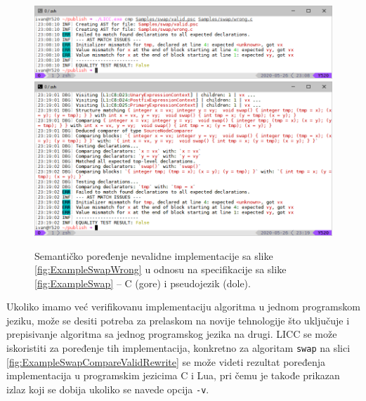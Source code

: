 \begin{figure}[h!]
\centering
\includegraphics[scale=0.65]{images/eval/cmp_wrong.png}
\includegraphics[scale=0.65]{images/eval/cmp_wrong_v.png}
\caption{Semantičko poređenje nevalidne implementacije sa slike \ref{fig:ExampleSwapWrong} u odnosu na specifikacije sa slike \ref{fig:ExampleSwap} -- C (gore) i pseudojezik (dole).}
\label{fig:ExampleSwapCompareWrong}
\end{figure}

Ukoliko imamo već verifikovanu implementaciju algoritma u jednom programskom jeziku, može se desiti potreba za prelaskom na novije tehnologije što uključuje i prepisivanje algoritma sa jednog programskog jezika na drugi. LICC se može iskoristiti za poređenje tih implementacija, konkretno za algoritam \texttt{swap} na slici \ref{fig:ExampleSwapCompareValidRewrite} se može videti rezultat poređenja implementacija u programskim jezicima C i Lua, pri čemu je takođe prikazan izlaz koji se dobija ukoliko se navede opcija \texttt{-v}. 

